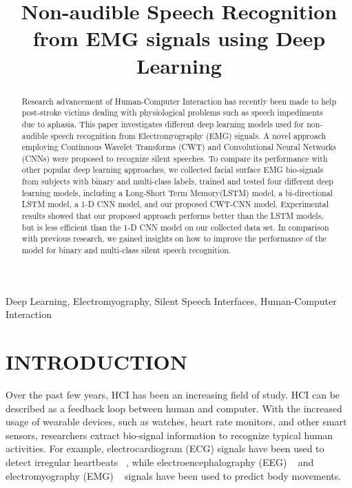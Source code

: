 \documentclass{article}
\title{Non-audible Speech Recognition from EMG signals using Deep Learning}
\begin{document}
%
\maketitle
%
\begin{abstract}
Research advancement of Human-Computer Interaction has recently been made to help post-stroke victims dealing with physiological problems such as speech impediments due to aphasia. This paper investigates different deep learning models used for non-audible speech recognition from Electromyography (EMG) signals. A novel approach employing Continuous Wavelet Transforms (CWT) and Convolutional Neural Networks (CNNs) were proposed to recognize silent speeches. To compare its performance with other popular deep learning approaches, we collected facial surface EMG bio-signals from subjects with binary and multi-class labels, trained and tested four different deep learning models, including a Long-Short Term Memory(LSTM) model, a bi-directional LSTM model, a 1-D CNN model, and our proposed CWT-CNN model.  Experimental results showed that our proposed approach performs better than the LSTM models, but is less efficient than the 1-D CNN model on our collected data set. In comparison with previous research,  we gained insights on how to improve the performance of the model for binary and multi-class silent speech recognition. 
\end{abstract}
%
\begin{keywords}
Deep Learning, Electromyography, Silent Speech Interfaces, Human-Computer Interaction
\end{keywords}
%
\section{INTRODUCTION}
\label{sec:INTRODUCTION}

Over the past few years, HCI has been an increasing field of study. HCI can be described as a feedback loop between human and computer. With the increased usage of wearable devices, such as watches, heart rate monitors, and other smart sensors, researchers extract bio-signal information to recognize typical human activities.  For example, electrocardiogram (ECG) signals have been used to detect irregular heartbeats ~\cite{noauthor_classify_nodate}, while electroencephalography (EEG) ~\cite{eltvik_deep_nodate} and electromyography (EMG)  ~\cite{altamirano_emg_nodate} signals have been used to predict body movements. 
\end{document}
